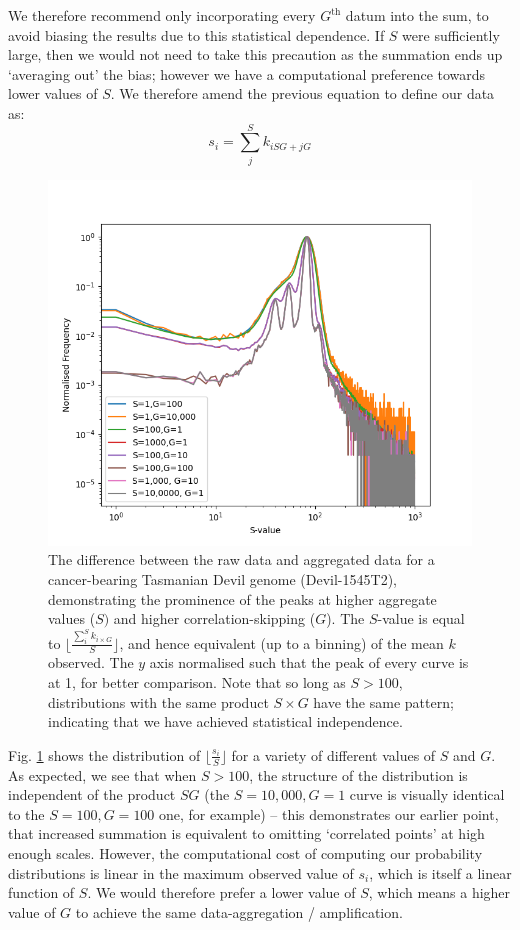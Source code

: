 \documentclass[fleqn,usenatbib]{mnras}
\begin{document}
{			We therefore recommend only incorporating every $G^\text{th}$ datum into the sum, to avoid biasing the results due to this statistical dependence. If $S$ were sufficiently large, then we would not need to take this precaution as the summation ends up `averaging out' the bias; however we have a computational preference towards lower values of $S$. We therefore amend the previous equation to define our data as:
			\begin{equation}
				s_i = \sum_j^S k_{iSG + jG}
			\end{equation}
			\begin{figure}
				\includegraphics[width=\linewidth,keepaspectratio=true]{Figures/aggregate.png}
				\caption{The difference between the raw data and aggregated data for a cancer-bearing Tasmanian Devil genome (Devil-1545T2), demonstrating the prominence of the peaks at higher aggregate values ($S)$ and higher correlation-skipping ($G$). The $S$-value is equal to $\lfloor \frac{\sum_{i}^S k_{i\times G}}{S} \rfloor$, and hence equivalent (up to a binning) of the mean $k$ observed. The $y$ axis normalised such that the peak of every curve is at 1, for better comparison. Note that so long as $S > 100$, distributions with the same product $S\times G$ have the same pattern; indicating that we have achieved statistical independence.}\label{F:Aggregation}
			\end{figure}

			Fig. \ref{F:Aggregation} shows the distribution of $\lfloor\frac{s_i}{S}\rfloor$ for a variety of different values of $S$ and $G$. As expected, we see that when $ S> 100$, the structure of the distribution is independent of the product $SG$ (the $S=10,000, G=1$ curve is visually identical to the $S=100, G= 100$ one, for example) -- this demonstrates our earlier point, that increased summation is equivalent to omitting `correlated points' at high enough scales. However, the computational cost of computing our probability distributions is linear in the maximum observed value of $s_i$, which is itself a linear function of $S$. We would therefore prefer a lower value of $S$, which means a higher value of $G$ to achieve the same data-aggregation / amplification.
		}
\end{document}
